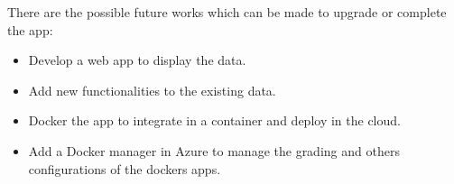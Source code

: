 \documentclass[12pt]{report} %
\begin{document}
There are the possible future works which can be made to upgrade or complete the app:

\begin{itemize}
	\item Develop a web app to display the data. 
	\item Add new functionalities to the existing data.
	\item Docker the app to integrate in a container and deploy in the cloud.
	\item Add a Docker manager in Azure to manage the grading and others configurations of the dockers apps.	
\end{itemize}



\clearpage
{}
\printbibliography




\end{document}
